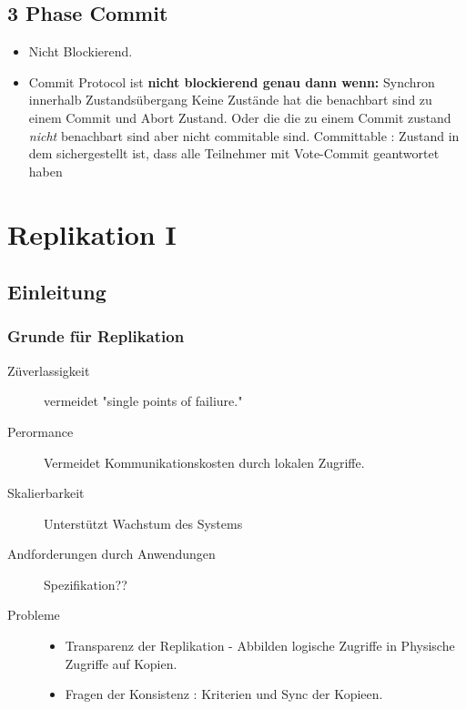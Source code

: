 \documentclass[a4paper,10pt,titlepage=false]{scrreprt}
\begin{document}
\section{3 Phase Commit} %
\label{sec:3_phase_commit}
\begin{itemize}
  \item Nicht Blockierend.
  \item Commit Protocol ist \textbf{nicht blockierend genau dann wenn:}
  \subitem Synchron innerhalb Zustandsübergang
  \subitem Keine Zustände hat die benachbart sind zu einem Commit und Abort Zustand. Oder die die zu einem Commit zustand \textit{nicht} benachbart sind aber nicht commitable sind.
  \subitem Committable : Zustand in dem sichergestellt ist, dass alle
Teilnehmer mit Vote-Commit geantwortet haben
\end{itemize}

\chapter{Replikation I} %
\label{cha:replikation_i}

\section{Einleitung} %
\label{sec:einleitung}
\subsection{Grunde für Replikation} %
\label{sub:grunde_f_r_replikation}
\begin{description}
  \item[Züverlassigkeit] vermeidet "single points of failiure."
  \item[Perormance] Vermeidet Kommunikationskosten durch lokalen Zugriffe.
  \item[Skalierbarkeit] Unterstützt Wachstum des Systems
  \item[Andforderungen durch Anwendungen] Spezifikation??
  \item[Probleme] \begin{itemize}
    \item Transparenz der Replikation - Abbilden logische Zugriffe in Physische Zugriffe auf Kopien.
    \item Fragen der Konsistenz : Kriterien und Sync der Kopieen.
  \end{itemize} 
\end{description}
\end{document}
